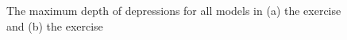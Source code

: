 \documentclass{isprs}
\begin{document}
\begin{figure}
\begin{center}
\caption{The maximum depth of depressions for all models in (a) the  exercise and (b) the  exercise}
\label{fig:max_depressions}
\end{center}
\end{figure}
%
\end{document}
